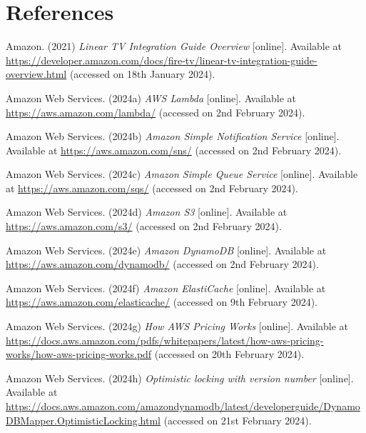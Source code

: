 \section{References}

\noindent Amazon. (2021) \textit{Linear TV Integration Guide Overview} [online]. Available at \url{https://developer.amazon.com/docs/fire-tv/linear-tv-integration-guide-overview.html} (accessed on 18th January 2024).
\vspace{0.2cm}

\noindent Amazon Web Services. (2024a) \textit{AWS Lambda} [online]. Available at \url{https://aws.amazon.com/lambda/} (accessed on 2nd February 2024).
\vspace{0.2cm}

\noindent Amazon Web Services. (2024b) \textit{Amazon Simple Notification Service} [online]. Available at \url{https://aws.amazon.com/sns/} (accessed on 2nd February 2024).
\vspace{0.2cm}

\noindent Amazon Web Services. (2024c) \textit{Amazon Simple Queue Service} [online]. Available at \url{https://aws.amazon.com/sqs/} (accessed on 2nd February 2024).
\vspace{0.2cm}

\noindent Amazon Web Services. (2024d) \textit{Amazon S3} [online]. Available at \url{https://aws.amazon.com/s3/} (accessed on 2nd February 2024).
\vspace{0.2cm}

\noindent Amazon Web Services. (2024e) \textit{Amazon DynamoDB} [online]. Available at \url{https://aws.amazon.com/dynamodb/} (accessed on 2nd February 2024).
\vspace{0.2cm}

\noindent Amazon Web Services. (2024f) \textit{Amazon ElastiCache} [online]. Available at \url{https://aws.amazon.com/elasticache/} (accessed on 9th February 2024).
\vspace{0.2cm}

\noindent Amazon Web Services. (2024g) \textit{How AWS Pricing Works} [online]. Available at \url{https://docs.aws.amazon.com/pdfs/whitepapers/latest/how-aws-pricing-works/how-aws-pricing-works.pdf} (accessed on 20th February 2024).
\vspace{0.2cm}

\noindent Amazon Web Services. (2024h) \textit{Optimistic locking with version number} [online]. Available at \url{https://docs.aws.amazon.com/amazondynamodb/latest/developerguide/DynamoDBMapper.OptimisticLocking.html} (accessed on 21st February 2024).
\vspace{0.2cm}


